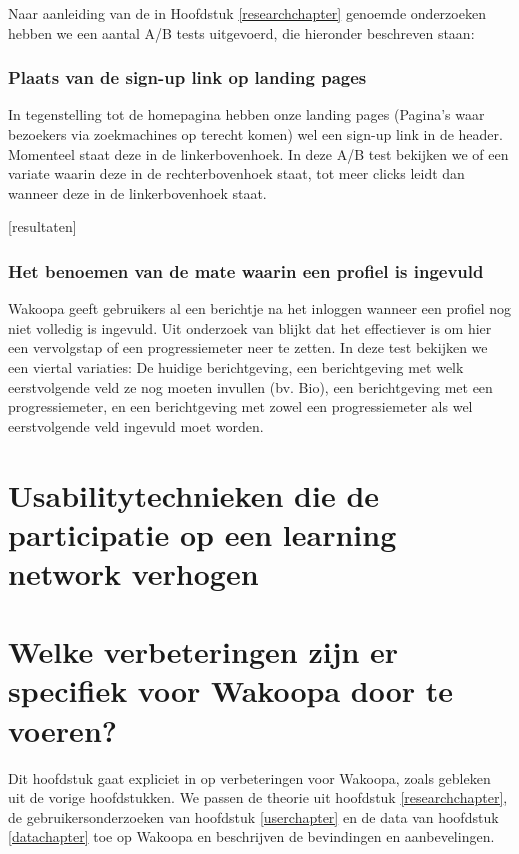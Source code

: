 \documentclass[a4paper, 10pt, pdftex]{report}
\begin{document}
    Naar aanleiding van de in Hoofdstuk \ref{researchchapter} genoemde onderzoeken hebben we een aantal A/B tests uitgevoerd, die hieronder beschreven staan:

    \subsection{Plaats van de sign-up link op landing pages}
      \label{ctatest}
      In tegenstelling tot de homepagina hebben onze landing pages (Pagina's waar bezoekers via zoekmachines op terecht komen) wel een sign-up link in de header. Momenteel staat deze in de linkerbovenhoek. In deze A/B test bekijken we of een variate waarin deze in de rechterbovenhoek staat, tot meer clicks leidt dan wanneer deze in de linkerbovenhoek staat.

      [resultaten]

    \subsection{Het benoemen van de mate waarin een profiel is ingevuld}
      \label{profileprogress}
      Wakoopa geeft gebruikers al een berichtje na het inloggen wanneer een profiel nog niet volledig is ingevuld. Uit onderzoek van \cite{Brouns2008} blijkt dat het effectiever is om hier een vervolgstap of een progressiemeter neer te zetten. In deze test bekijken we een viertal variaties: De huidige berichtgeving, een berichtgeving met welk eerstvolgende veld ze nog moeten invullen (bv. Bio), een berichtgeving met een progressiemeter, en een berichtgeving met zowel een progressiemeter als wel eerstvolgende veld ingevuld moet worden.

  \newpage
  \chapter{Usabilitytechnieken die de participatie op een learning network verhogen}


  \newpage
  \chapter{Welke verbeteringen zijn er specifiek voor Wakoopa door te voeren?}
    \newpage

    Dit hoofdstuk gaat expliciet in op verbeteringen voor Wakoopa, zoals gebleken uit de vorige hoofdstukken. We passen de theorie uit hoofdstuk \ref{researchchapter}, de gebruikersonderzoeken van hoofdstuk \ref{userchapter} en de data van hoofdstuk \ref{datachapter} toe op Wakoopa en beschrijven de bevindingen en aanbevelingen.
\end{document}
